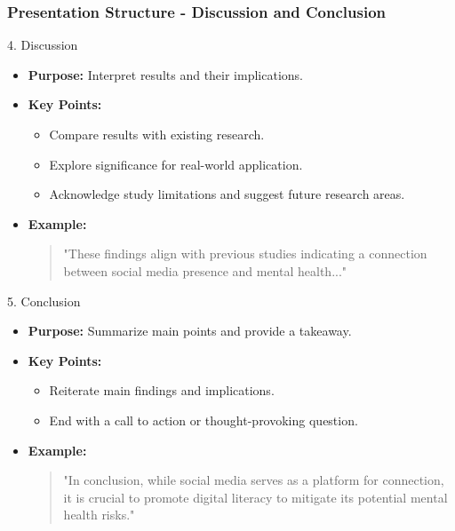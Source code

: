 \documentclass[aspectratio=169]{beamer}
\begin{document}
\begin{frame}[fragile]
    \frametitle{Presentation Structure - Discussion and Conclusion}
    \begin{block}{4. Discussion}
        \begin{itemize}
            \item \textbf{Purpose:} Interpret results and their implications.
            \item \textbf{Key Points:}
                \begin{itemize}
                    \item Compare results with existing research.
                    \item Explore significance for real-world application.
                    \item Acknowledge study limitations and suggest future research areas.
                \end{itemize}
            \item \textbf{Example:} 
                \begin{quote}
                    "These findings align with previous studies indicating a connection between social media presence and mental health..."
                \end{quote}
        \end{itemize}
    \end{block}
    
    \begin{block}{5. Conclusion}
        \begin{itemize}
            \item \textbf{Purpose:} Summarize main points and provide a takeaway.
            \item \textbf{Key Points:}
                \begin{itemize}
                    \item Reiterate main findings and implications.
                    \item End with a call to action or thought-provoking question.
                \end{itemize}
            \item \textbf{Example:} 
                \begin{quote}
                    "In conclusion, while social media serves as a platform for connection, it is crucial to promote digital literacy to mitigate its potential mental health risks."
                \end{quote}
        \end{itemize}
    \end{block}
\end{frame}
\end{document}
